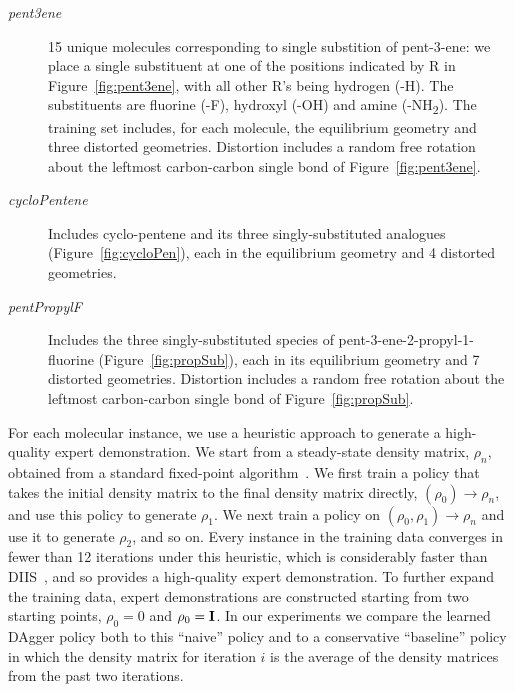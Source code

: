 \documentclass[twoside,11pt]{article}
\begin{document}
\begin{description}
\item[\textit{pent3ene}] 15 unique molecules corresponding to single substition of pent-3-ene: we place a single substituent at one of the positions indicated by R in Figure~\ref{fig:pent3ene}, with all other R's being hydrogen (-H). The substituents are fluorine (-F), hydroxyl (-OH) and amine (-NH\textsubscript{2}). The training set includes, for each molecule, the equilibrium geometry and three distorted geometries. Distortion includes a random free rotation about the leftmost carbon-carbon single bond of Figure~\ref{fig:pent3ene}. 
\item[\textit{cycloPentene}]Includes cyclo-pentene and its three singly-substituted analogues (Figure~\ref{fig:cycloPen}), each in the equilibrium geometry and 4 distorted geometries. 
\item[\textit{pentPropylF}] Includes the three singly-substituted species of pent-3-ene-2-propyl-1-fluorine (Figure~\ref{fig:propSub}), each in its equilibrium geometry and 7 distorted geometries. Distortion includes a random free rotation about the leftmost carbon-carbon single bond of Figure~\ref{fig:propSub}. 
\end{description}

For each molecular instance, we use a heuristic approach to generate a high-quality expert demonstration.  We start from a steady-state density matrix, $\rho_n$, obtained from a standard fixed-point algorithm~\citep{Pulay1980}.  We first train a policy that takes the initial density matrix to the final density matrix directly, $(\rho_0) \rightarrow \rho_n$, and use this policy to generate $\rho_1$.  We next train a policy on $(\rho_0, \rho_1) \rightarrow \rho_n$ and use it to generate $\rho_2$, and so on. Every instance in the training data converges in fewer than 12 iterations under this heuristic, which is considerably faster than DIIS~\citep{Pulay1980}, and so provides a high-quality expert demonstration. To further expand the training data, expert demonstrations are constructed starting from two starting points, $\rho_0 = 0$ and $\rho_0 = {\bf I}$.  In our experiments we compare the learned DAgger policy both to this ``naive'' policy and to a conservative ``baseline'' policy in which the density matrix for iteration $i$ is the average of the density matrices from the past two iterations.
\end{document}
